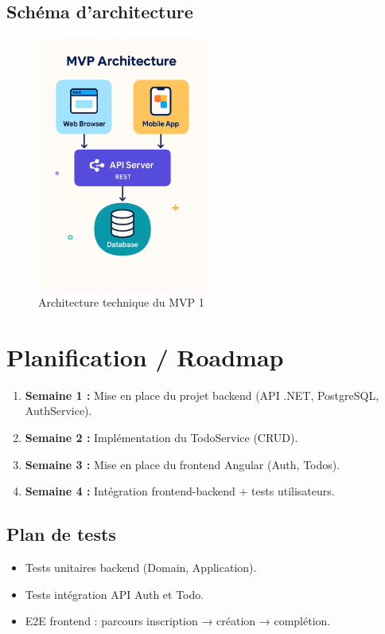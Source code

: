 \subsection{Schéma d’architecture}
\begin{figure}[H]
	\centering
	\includegraphics[width=0.5\textwidth]{images/Archi_mvp.png}
	\caption{Architecture technique du MVP 1}
\end{figure}

\section{Planification / Roadmap}
\begin{enumerate}
	\item \textbf{Semaine 1 :} Mise en place du projet backend (API .NET, PostgreSQL, AuthService). 
	\item \textbf{Semaine 2 :} Implémentation du TodoService (CRUD).
	\item \textbf{Semaine 3 :} Mise en place du frontend Angular (Auth, Todos).
	\item \textbf{Semaine 4 :} Intégration frontend-backend + tests utilisateurs.
\end{enumerate}
\subsection{Plan de tests}
\begin{itemize}
	\item Tests unitaires backend (Domain, Application).
	\item Tests intégration API Auth et Todo.
	\item E2E frontend : parcours inscription → création → complétion.
\end{itemize}

